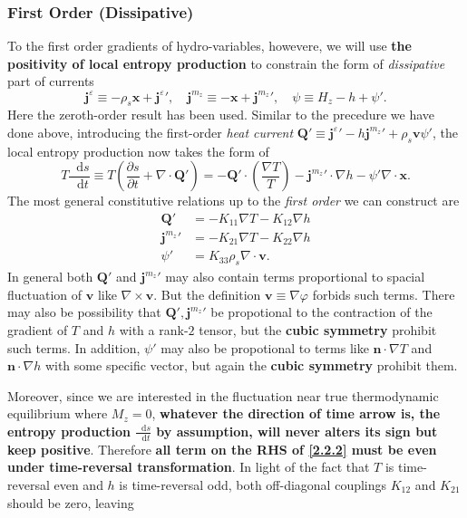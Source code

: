 \documentclass[10pt,nofootinbib]{revtex4}
\newcommand*\dd{\mathop{}\!\mathrm{d}}
\begin{document}
		\subsubsection{First Order (Dissipative)}
			To the first order gradients of hydro-variables, howevere, we will use {\bf the positivity of local entropy production} to constrain the form of \emph{dissipative} part of currents
			\begin{equation}\label{2.2.1}
				\bm{j}^\varepsilon\equiv-\rho_s\bm{x}+{\bm{j}^\varepsilon}',\quad\bm{j}^{m_z}\equiv-\bm{x}+{\bm{j}^{m_z}}',\quad \psi\equiv H_z-h+\psi'.
			\end{equation}
			Here the zeroth-order result has been used.	Similar to the precedure we have done above, introducing the first-order \emph{heat current} $\bm{Q'}\equiv{\bm{j}^\varepsilon}'-h{\bm{j}^{m_z}}'+\rho_s\bm{v}\psi'$, the local entropy production now takes the form of
			\begin{equation}\label{2.2.2}
				T\dfrac{\dd s}{\dd t}\equiv T \left(\dfrac{\partial s}{\partial t}+\nabla\cdot\bm{Q'}\right)=-\bm{Q'}\cdot\left(\dfrac{\nabla T}{T}\right)-{\bm{j}^{m_z}}'\cdot\nabla h-\psi'\nabla\cdot\bm{x}.
			\end{equation}
			The most general constitutive relations up to the \emph{first order} we can construct are
			\begin{align*}
				\bm{Q}'&=-K_{11}\nabla T-K_{12}\nabla h\\
				{\bm{j}^{m_z}}'&=-K_{21}\nabla T-K_{22}\nabla h\\
				\psi'&=K_{33}\rho_s\nabla\cdot\bm{v}.
			\end{align*}
			In general both $\bm{Q}'$ and ${\bm{j}^{m_z}}'$ may also contain terms proportional to spacial fluctuation of $\bm{v}$ like $\nabla\times\bm{v}$. But the definition $\bm{v}\equiv\nabla\varphi$ forbids such terms. There may also be possibility that $\bm{Q'},{\bm{j}^{m_z}}'$ be propotional to the contraction of the gradient of $T$ and $h$ with a rank-$2$ tensor, but the {\color{red}\textbf{cubic symmetry}} prohibit such terms. In addition, $\psi'$ may also be propotional to terms like $\bm{n}\cdot\nabla T$ and $\bm{n}\cdot\nabla h$ with some specific vector, but again the {\color{red}\textbf{cubic symmetry}} prohibit them.\par
			Moreover, since we are interested in the fluctuation near true thermodynamic equilibrium where $M_z=0$, \textbf{\color{red} whatever the direction of time arrow is, the entropy production $\frac{\dd s}{\dd t}$ by assumption, will never alters its sign but keep positive}. Therefore \textbf{all term on the RHS of \eqref{2.2.2} must be even under time-reversal transformation}. In light of the fact that $T$ is time-reversal even and $h$ is time-reversal odd, both off-diagonal couplings $K_{12}$ and $K_{21}$ should be zero, leaving
\end{document}
